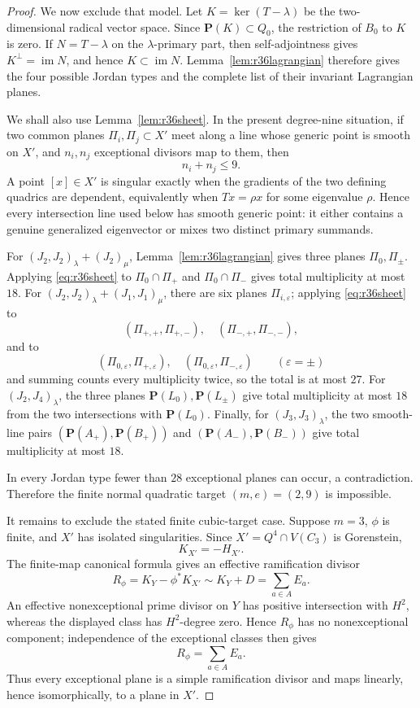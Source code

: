 \documentclass[11pt,reqno]{amsart}
\theoremstyle{remark}
\newcommand{\PP}{\mathbf P}
\begin{document}
\begin{proof}
We now exclude that model.  Let $K=\ker(T-\lambda)$ be the two-dimensional radical vector space.  Since $\PP(K)\subset Q_0$, the restriction of $B_0$ to $K$ is zero.  If $N=T-\lambda$ on the $\lambda$-primary part, then self-adjointness gives $K^\perp=\operatorname{im}N$, and hence $K\subset\operatorname{im}N$.  Lemma~\ref{lem:r36lagrangian} therefore gives the four possible Jordan types and the complete list of their invariant Lagrangian planes.

We shall also use Lemma~\ref{lem:r36sheet}.  In the present degree-nine situation, if two common planes $\Pi_i,\Pi_j\subset X'$ meet along a line whose generic point is smooth on $X'$, and $n_i,n_j$ exceptional divisors map to them, then
\[
n_i+n_j\le9. \tag{R36-S}\label{eq:r36sheet}
\]
A point $[x]\in X'$ is singular exactly when the gradients of the two defining quadrics are dependent, equivalently when $Tx=\rho x$ for some eigenvalue $\rho$.  Hence every intersection line used below has smooth generic point: it either contains a genuine generalized eigenvector or mixes two distinct primary summands.

For $(J_2,J_2)_\lambda+(J_2)_\mu$, Lemma~\ref{lem:r36lagrangian} gives three planes $\Pi_0,\Pi_\pm$.  Applying \eqref{eq:r36sheet} to $\Pi_0\cap\Pi_+$ and $\Pi_0\cap\Pi_-$ gives total multiplicity at most $18$.  For $(J_2,J_2)_\lambda+(J_1,J_1)_\mu$, there are six planes $\Pi_{i,\varepsilon}$; applying \eqref{eq:r36sheet} to
\[
(\Pi_{+,+},\Pi_{+,-}),\quad(\Pi_{-,+},\Pi_{-,-}),
\]
and to
\[
(\Pi_{0,\varepsilon},\Pi_{+,\varepsilon}),\quad
(\Pi_{0,\varepsilon},\Pi_{-,\varepsilon})
\qquad(\varepsilon=\pm)
\]
and summing counts every multiplicity twice, so the total is at most $27$.  For $(J_2,J_4)_\lambda$, the three planes $\PP(L_0),\PP(L_\pm)$ give total multiplicity at most $18$ from the two intersections with $\PP(L_0)$.  Finally, for $(J_3,J_3)_\lambda$, the two smooth-line pairs $(\PP(A_+),\PP(B_+))$ and $(\PP(A_-),\PP(B_-))$ give total multiplicity at most $18$.

In every Jordan type fewer than $28$ exceptional planes can occur, a contradiction.  Therefore the finite normal quadratic target $(m,e)=(2,9)$ is impossible.

It remains to exclude the stated finite cubic-target case.  Suppose $m=3$, $\phi$ is finite, and $X'$ has isolated singularities.  Since $X'=Q^4\cap V(C_3)$ is Gorenstein,
\[
K_{X'}=-H_{X'}.
\]
The finite-map canonical formula gives an effective ramification divisor
\[
R_\phi=K_Y-\phi^*K_{X'}\sim K_Y+D=\sum_{a\in A}E_a.
\]
An effective nonexceptional prime divisor on $Y$ has positive intersection with $H^2$, whereas the displayed class has $H^2$-degree zero.  Hence $R_\phi$ has no nonexceptional component; independence of the exceptional classes then gives
\[
R_\phi=\sum_{a\in A}E_a.
\]
Thus every exceptional plane is a simple ramification divisor and maps linearly, hence isomorphically, to a plane in $X'$.


\end{proof}
\end{document}
